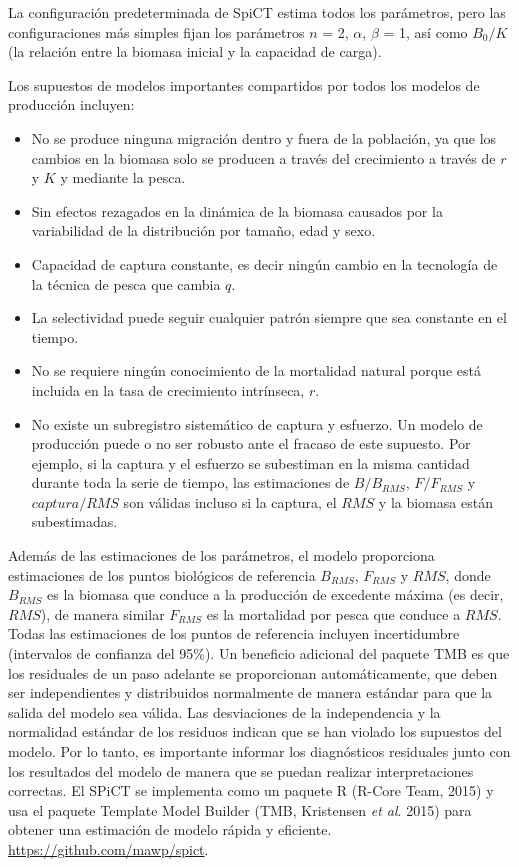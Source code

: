 \documentclass[
  spanish,
]{article}
\begin{document}
La configuración predeterminada de SpiCT estima todos los parámetros,
pero las configuraciones más simples fijan los parámetros \(n\) = 2,
\(\alpha\), \(\beta\) = 1, así como \(B_0/K\) (la relación entre la
biomasa inicial y la capacidad de carga).

Los supuestos de modelos importantes compartidos por todos los modelos
de producción incluyen:

\begin{itemize}
\item
  No se produce ninguna migración dentro y fuera de la población, ya que
  los cambios en la biomasa solo se producen a través del crecimiento a
  través de \(r\) y \(K\) y mediante la pesca.
\item
  Sin efectos rezagados en la dinámica de la biomasa causados por la
  variabilidad de la distribución por tamaño, edad y sexo.
\item
  Capacidad de captura constante, es decir ningún cambio en la
  tecnología de la técnica de pesca que cambia \(q\).
\item
  La selectividad puede seguir cualquier patrón siempre que sea
  constante en el tiempo.
\item
  No se requiere ningún conocimiento de la mortalidad natural porque
  está incluida en la tasa de crecimiento intrínseca, \(r\).
\item
  No existe un subregistro sistemático de captura y esfuerzo. Un modelo
  de producción puede o no ser robusto ante el fracaso de este supuesto.
  Por ejemplo, si la captura y el esfuerzo se subestiman en la misma
  cantidad durante toda la serie de tiempo, las estimaciones de
  \(B/B_{RMS}\), \(F/F_{RMS}\) y \(captura/RMS\) son válidas incluso si
  la captura, el \(RMS\) y la biomasa están subestimadas.
\end{itemize}

Además de las estimaciones de los parámetros, el modelo proporciona
estimaciones de los puntos biológicos de referencia \(B_{RMS}\),
\(F_{RMS}\) y \(RMS\), donde \(B_{RMS}\) es la biomasa que conduce a la
producción de excedente máxima (es decir, \(RMS\)), de manera similar
\(F_{RMS}\) es la mortalidad por pesca que conduce a \(RMS\). Todas las
estimaciones de los puntos de referencia incluyen incertidumbre
(intervalos de confianza del 95\%). Un beneficio adicional del paquete
TMB es que los residuales de un paso adelante se proporcionan
automáticamente, que deben ser independientes y distribuidos normalmente
de manera estándar para que la salida del modelo sea válida. Las
desviaciones de la independencia y la normalidad estándar de los
residuos indican que se han violado los supuestos del modelo. Por lo
tanto, es importante informar los diagnósticos residuales junto con los
resultados del modelo de manera que se puedan realizar interpretaciones
correctas. El SPiCT se implementa como un paquete R (R-Core Team, 2015)
y usa el paquete Template Model Builder (TMB, Kristensen \emph{et al}.
2015) para obtener una estimación de modelo rápida y eficiente.
\url{https://github.com/mawp/spict}.
\end{document}
